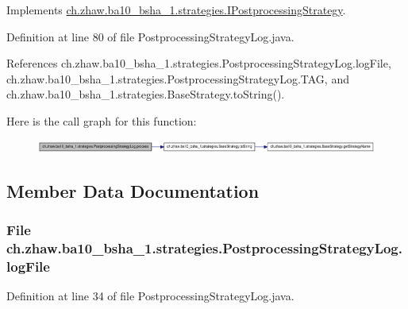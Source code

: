 Implements \hyperlink{interfacech_1_1zhaw_1_1ba10__bsha__1_1_1strategies_1_1IPostprocessingStrategy_a0bb435d4c5cb8ce3b3909ad81961d912}{ch.zhaw.ba10\_\-bsha\_\-1.strategies.IPostprocessingStrategy}.

Definition at line 80 of file PostprocessingStrategyLog.java.

References ch.zhaw.ba10\_\-bsha\_\-1.strategies.PostprocessingStrategyLog.logFile, ch.zhaw.ba10\_\-bsha\_\-1.strategies.PostprocessingStrategyLog.TAG, and ch.zhaw.ba10\_\-bsha\_\-1.strategies.BaseStrategy.toString().

Here is the call graph for this function:\nopagebreak
\begin{figure}[H]
\begin{center}
\leavevmode
\includegraphics[width=420pt]{classch_1_1zhaw_1_1ba10__bsha__1_1_1strategies_1_1PostprocessingStrategyLog_a284bd1d88fb08a15ec240911d11d23c9_cgraph}
\end{center}
\end{figure}


\subsection{Member Data Documentation}
\hypertarget{classch_1_1zhaw_1_1ba10__bsha__1_1_1strategies_1_1PostprocessingStrategyLog_a3e013a950da5adee47ebb45cba9a4abd}{
\subsubsection[{logFile}]{\setlength{\rightskip}{0pt plus 5cm}File {\bf ch.zhaw.ba10\_\-bsha\_\-1.strategies.PostprocessingStrategyLog.logFile}}}
\label{classch_1_1zhaw_1_1ba10__bsha__1_1_1strategies_1_1PostprocessingStrategyLog_a3e013a950da5adee47ebb45cba9a4abd}


Definition at line 34 of file PostprocessingStrategyLog.java.

